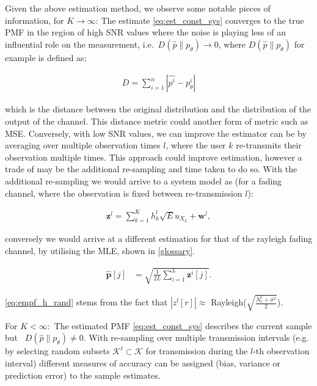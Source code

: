 \documentclass{article}
\begin{document}
Given the above estimation method, we observe some notable pieces of information, for $K \rightarrow \infty$: The estimate \cref{eq:est_const_sys} converges to the true PMF in the region of high SNR values where the noise is playing less of an influential role on the measurement, i.e.~$D(\hat{p}\| p_{\theta}) \rightarrow 0$, where $D(\hat{p}\| p_{\theta})$ for example is defined as;

\begin{align}
    D = \sum_{i=1}^n |\hat{p^i} - p_{\theta}^i|
\end{align}

which is the distance between the original distribution and the distribution of the output of the channel. This distance metric could another form of metric such as \ac{MSE}. Conversely, with low SNR values, we can improve the estimator can be by averaging over multiple observation times $l$, where the user $k$ re-transmits their observation multiple times. This approach could improve estimation, however a trade of may be the additional re-sampling and time taken to do so. With the additional re-sampling we would arrive to a system model as (for a fading channel, where the observation is fixed between re-transmission $l$):

\begin{align}
    \boldsymbol{z}^l = \sum_{k=1}^K h_k^l  \sqrt{E}u_{X_k} + \boldsymbol{w}^l, \label{eq:system_model_retrans}
\end{align}


conversely we would arrive at a different estimation for that of the rayleigh fading channel, by utilising the \ac{MLE}, shown in \cref{glossary}. 


\begin{align}
    \boldsymbol{\hat{p}}[j] &= \sqrt{\frac{1}{2L} \sum_{i = 1}^{L}\boldsymbol{z}^i[j]}.\label{eq:empf_h_rand}
\end{align}

\cref{eq:empf_h_rand} stems from the fact that $|z^l[r]| \approx$  Rayleigh($\sqrt{\frac{N_{r}^l + \sigma^2}{2}}$).

For $K <\infty:$ The estimated PMF \cref{eq:est_const_sys} describes the current sample but ~$D(\hat{p}\| p_{\theta}) \neq 0$. With re-sampling over multiple transmission intervals (e.g. by selecting random subsets $\mathcal{K}^l \subset \mathcal{K}$ for transmission during the $l$-th observation interval) different measures of accuracy can be assigned (bias, variance or prediction error) to the sample estimates.
\end{document}
